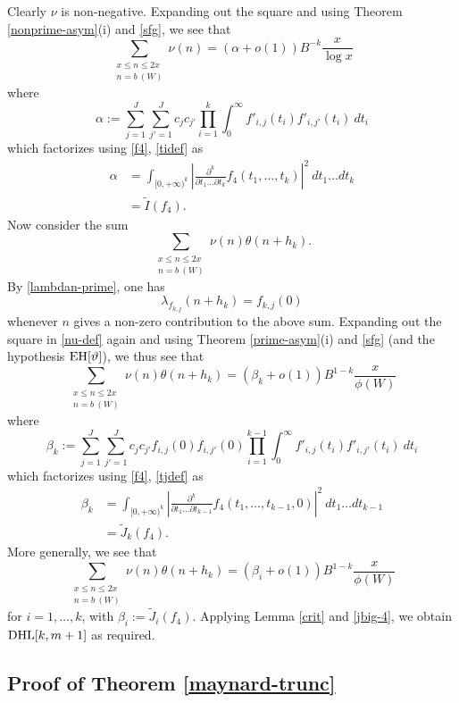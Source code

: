 Clearly $\nu$ is non-negative.  Expanding out the square and using Theorem \ref{nonprime-asym}(i) and \eqref{sfg}, we see that
$$ \sum_{\substack{x \leq n \leq 2x\\ n = b\ (W)}} \nu(n) = (\alpha + o(1)) B^{-k} \frac{x}{\log x}$$
where
$$ \alpha := \sum_{j=1}^J \sum_{j'=1}^J c_j c_{j'} \prod_{i=1}^k \int_0^\infty f'_{i,j}(t_i) f'_{i,j'}(t_i)\ dt_i$$
which factorizes using \eqref{f4}, \eqref{tidef} as
\begin{align*}
\alpha &= \int_{[0,+\infty)^k} \left|\frac{\partial^k}{\partial t_1 \dots \partial t_k} f_4(t_1,\dots,t_k)\right|^2\ dt_1 \dots dt_k \\
&= \tilde I(f_4).
\end{align*}
Now consider the sum
$$ \sum_{\substack{x \leq n \leq 2x\\ n = b\ (W)}} \nu(n) \theta(n+h_k).$$
By \eqref{lambdan-prime}, one has
$$ \lambda_{f_{k,j}}(n+h_k) = f_{k,j}(0)$$
whenever $n$ gives a non-zero contribution to the above sum.  Expanding out the square in \eqref{nu-def} again and using Theorem \ref{prime-asym}(i) and \eqref{sfg} (and the hypothesis $\operatorname*{EH}[\vartheta]$), we thus see that
$$ \sum_{\substack{x \leq n \leq 2x\\ n = b\ (W)}} \nu(n) \theta(n+h_k) = (\beta_k + o(1)) B^{1-k} \frac{x}{\phi(W)}$$
where
$$ \beta_k := \sum_{j=1}^J \sum_{j'=1}^J c_j c_{j'} f_{i,j}(0) f_{i,j'}(0) \prod_{i=1}^{k-1} \int_0^\infty f'_{i,j}(t_i) f'_{i,j'}(t_i)\ dt_i$$
which factorizes using \eqref{f4}, \eqref{tjdef} as
\begin{align*}
\beta_k &= \int_{[0,+\infty)^k} \left|\frac{\partial^k}{\partial t_1 \dots \partial t_{k-1}} f_4(t_1,\dots,t_{k-1},0)\right|^2\ dt_1 \dots dt_{k-1} \\
&= \tilde J_k(f_4).
\end{align*}
More generally, we see that
$$ \sum_{\substack{x \leq n \leq 2x\\ n = b\ (W)}} \nu(n) \theta(n+h_k) = (\beta_i + o(1)) B^{1-k} \frac{x}{\phi(W)}$$
for $i=1,\dots,k$, with $\beta_i := \tilde J_i(f_4)$.  Applying Lemma \ref{crit} and \eqref{jbig-4}, we obtain $\operatorname*{DHL}[k,m+1]$ as required.

\subsection{Proof of Theorem \ref{maynard-trunc}}\label{trunc-sec}

